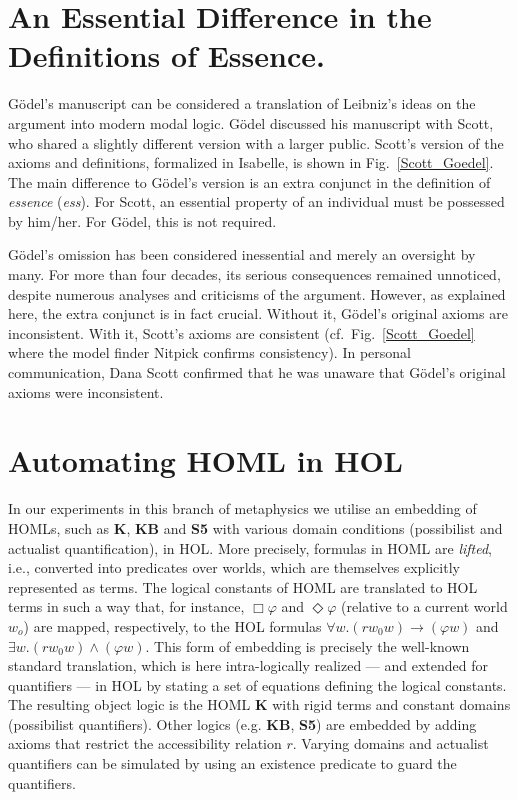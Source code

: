 \documentclass{llncs}
\newcommand{\imp}{{\rightarrow}}
\begin{document}
\section{An Essential Difference in the Definitions of Essence.}
\label{sec:history}
G\"odel's manuscript can be considered a translation of Leibniz's
ideas on the argument into modern modal logic. G\"odel
discussed his manuscript with Scott, who shared a slightly different
version with a larger public. Scott's version of the axioms and
definitions, formalized in Isabelle, is shown in
Fig.~\ref{Scott_Goedel}. 
The main difference to G\"odel's version is an
extra conjunct in the definition of \emph{essence} (\emph{ess}). For Scott,
an essential property of an individual must be possessed by
him/her. For G\"odel, this is not required. 


G\"odel's omission has been
considered inessential and merely an oversight by many. 
For more than four decades, its serious consequences remained unnoticed, 
despite numerous analyses and criticisms of the
argument.
However, as explained here, the extra conjunct is in
fact crucial. Without it, G\"odel's original axioms are
inconsistent. With it, Scott's axioms are consistent (cf.~Fig.~\ref{Scott_Goedel}
where the model finder Nitpick \cite{Nitpick} confirms consistency). In
personal communication, Dana Scott confirmed that he was unaware
that G\"odel's original axioms were inconsistent.









\section{Automating HOML in HOL}\label{sec:homlinhol}



In our experiments in this branch of metaphysics we
utilise an embedding of HOMLs, such as \textbf{K}, \textbf{KB} and
\textbf{S5} with various domain conditions (possibilist and actualist
quantification), in HOL. More precisely, formulas in HOML are \emph{lifted}, i.e., converted
into predicates over worlds, which are themselves explicitly
represented as terms. The logical constants of HOML are translated to
HOL terms in such a way that, for instance,
$\Box \varphi$ and $\Diamond \varphi$ (relative to a current world
$w_o$) are mapped, respectively, to the HOL formulas
$\forall w. (r w_0 w) \imp (\varphi w)$ and
$\exists w. (r w_0 w) \wedge (\varphi w)$. This form of embedding is
precisely the well-known standard translation,
which is here intra-logically realized --- and extended for
quantifiers --- in HOL by stating a set of equations defining the
logical constants. The resulting object logic is
the HOML \textbf{K} with rigid terms and constant domains (possibilist
quantifiers). Other logics (e.g. \textbf{KB}, \textbf{S5}) are
embedded by adding axioms that restrict the accessibility relation
$r$. Varying domains and actualist quantifiers can be simulated by
using an existence predicate to guard the quantifiers. 
\end{document}
